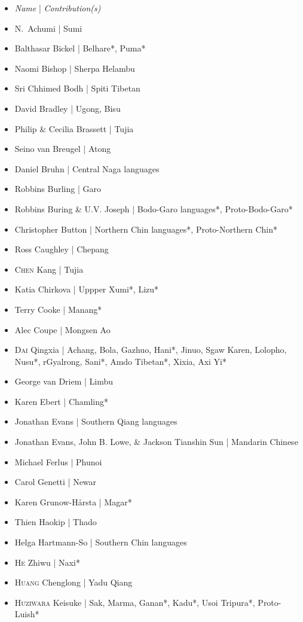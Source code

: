 \begin{itemize}
\item \textit{Name} | \textit{Contribution(s)}
\item N.\ Achumi | Sumi
\item Balthasar Bickel | Belhare*, Puma*
\item Naomi Bishop | Sherpa Helambu
\item Sri Chhimed Bodh | Spiti Tibetan
\item David Bradley | Ugong, Bisu
\item Philip \& Cecilia Brassett | Tujia
\item Seino van Breugel | Atong
\item Daniel Bruhn | Central Naga languages
\item Robbins Burling | Garo
\item Robbins Buring \& U.V. Joseph | Bodo-Garo languages*, Proto-Bodo-Garo*
\item Christopher Button | Northern Chin languages*, Proto-Northern Chin*
\item Ross Caughley | Chepang
\item \textsc{Chen} Kang | Tujia
\item Katia Chirkova | Uppper Xumi*, Lizu*
\item Terry Cooke | Manang*
\item Alec Coupe | Mongsen Ao
\item \textsc{Dai} Qingxia | Achang, Bola, Gazhuo, Hani*, Jinuo, Sgaw Karen, Lolopho, Nusu*, rGyalrong, Sani*, Amdo Tibetan*, Xixia, Axi Yi*
\item George van Driem | Limbu
\item Karen Ebert | Chamling*
\item Jonathan Evans | Southern Qiang languages
\item Jonathan Evans, John B. Lowe, \& Jackson Tianshin Sun | Mandarin Chinese
\item Michael Ferlus | Phunoi
\item Carol Genetti | Newar
\item Karen Grunow-Hårsta | Magar*
\item Thien Haokip | Thado
\item Helga Hartmann-So | Southern Chin languages
\item \textsc{He} Zhiwu | Naxi*
\item \textsc{Huang} Chenglong | Yadu Qiang
\item \textsc{Huziwara} Keisuke | Sak, Marma, Ganan*, Kadu*, Usoi Tripura*, Proto-Luish*

\end{itemize}
